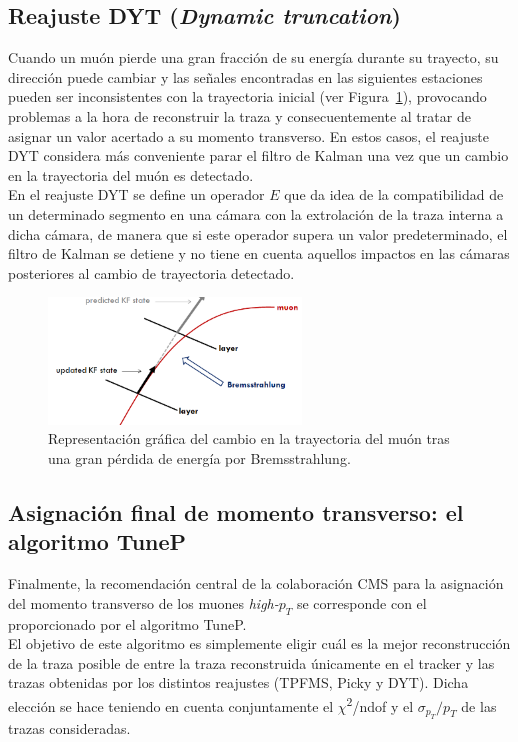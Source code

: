 \subsection{Reajuste DYT (\textit{Dynamic truncation})}\label{sec:DYT}

Cuando un mu\'on pierde una gran fracci\'on de su energ\'ia durante su trayecto, su direcci\'on puede cambiar y las se\~nales encontradas en las siguientes estaciones pueden ser inconsistentes con la trayectoria inicial (ver Figura~\ref{fig:energyloss}), provocando problemas a la hora de reconstruir la traza y consecuentemente al tratar de asignar un valor acertado a su momento transverso. En estos casos, el reajuste DYT considera m\'as conveniente parar el filtro de Kalman una vez que un cambio en la trayectoria del mu\'on es detectado. \\
En el reajuste DYT se define un operador $E$ que da idea de la compatibilidad de un determinado segmento en una c\'amara con la extrolaci\'on de la traza interna a dicha c\'amara, de manera que si este operador supera un valor predeterminado, el filtro de Kalman se detiene y no tiene en cuenta aquellos impactos en las c\'amaras posteriores al cambio de trayectoria detectado. 

\begin{figure}[h]
\centering
\includegraphics[width=0.60\textwidth]{figures/energyloss.png}
\caption{Representaci\'on gr\'afica del cambio en la trayectoria del mu\'on tras una gran p\'erdida de energ\'ia por Bremsstrahlung.}
\label{fig:energyloss}        
\end{figure}


\subsection{Asignaci\'on final de momento transverso: el algoritmo TuneP}\label{sec:TuneP}

Finalmente, la recomendaci\'on central de la colaboraci\'on CMS para la asignaci\'on del momento transverso de los muones \textit{high-$p_{T}$} se corresponde con el proporcionado por el algoritmo TuneP. \\
 El objetivo de este algoritmo es simplemente eligir cu\'al es la mejor reconstrucci\'on de la traza posible de entre la traza reconstruida \'unicamente en el tracker y las trazas obtenidas por los distintos reajustes (TPFMS, Picky y DYT). Dicha elecci\'on se hace teniendo en cuenta conjuntamente el $\chi$\textsuperscript{2}/ndof y el $\sigma_{p_{T}}/p_{T}$ de las trazas consideradas.
